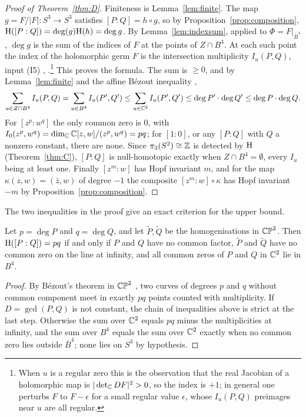 \begin{proof}[Proof of Theorem~\ref{thm:D}]
Finiteness is Lemma~\ref{lem:finite}. The map $g=F/|F|\colon S^3\to S^3$ satisfies $[P:Q]=h\circ g$, so by Proposition~\ref{prop:composition}, $\mathrm{H}([P:Q])=\deg(g)\mathrm{H}(h)=\deg g$. By Lemma~\ref{lem:indexsum}, applied to $\Phi=F|_{\bar B^4}$, $\deg g$ is the sum of the indices of $F$ at the points of $Z\cap B^4$. At each such point the index of the holomorphic germ $F$ is the intersection multiplicity $I_u(P,Q)$, input (I5) \cite[Chapter~5]{GH78}, \cite[Chapter~5]{AGV85}.\footnote{When $u$ is a regular zero this is the observation that the real Jacobian of a holomorphic map is $|\det_{\mathbb{C}} DF|^2>0$, so the index is $+1$; in general one perturbs $F$ to $F-\epsilon$ for a small regular value $\epsilon$, whose $I_u(P,Q)$ preimages near $u$ are all regular.} This proves the formula. The sum is $\ge0$, and by Lemma~\ref{lem:finite} and the affine B\'ezout inequality \cite[Section~5.3]{Ful69},
\[
\sum_{u\in Z\cap B^4}I_u(P,Q)=\sum_{u\in B^4}I_u(P',Q')\le\sum_{u\in\mathbb{C}^2}I_u(P',Q')\le\deg P'\cdot\deg Q'\le\deg P\cdot\deg Q .
\]
For $[z^p:w^q]$ the only common zero is $0$, with $I_0(z^p,w^q)=\dim_{\mathbb{C}}\mathbb{C}[z,w]/(z^p,w^q)=pq$; for $[1:0]$, or any $[P:Q]$ with $Q$ a nonzero constant, there are none. Since $\pi_3(S^2)\cong\mathbb{Z}$ is detected by $\mathrm{H}$ (Theorem~\ref{thm:C}), $[P:Q]$ is null-homotopic exactly when $Z\cap B^4=\emptyset$, every $I_u$ being at least one. Finally $[z^m:w]$ has Hopf invariant $m$, and for the map $\kappa(z,w)=(\bar z,w)$ of degree $-1$ the composite $[z^m:w]\circ\kappa$ has Hopf invariant $-m$ by Proposition~\ref{prop:composition}.
\end{proof}

The two inequalities in the proof give an exact criterion for the upper bound.

\begin{proposition}[Equality]\label{prop:equality}
Let $p=\deg P$ and $q=\deg Q$, and let $\tilde P,\tilde Q$ be the homogenisations in $\mathbb{CP}^2$. Then $\mathrm{H}([P:Q])=pq$ if and only if $P$ and $Q$ have no common factor, $\tilde P$ and $\tilde Q$ have no common zero on the line at infinity, and all common zeros of $P$ and $Q$ in $\mathbb{C}^2$ lie in $B^4$.
\end{proposition}

\begin{proof}
By B\'ezout's theorem in $\mathbb{CP}^2$ \cite[Section~5.3]{Ful69}, two curves of degrees $p$ and $q$ without common component meet in exactly $pq$ points counted with multiplicity. If $D=\gcd(P,Q)$ is not constant, the chain of inequalities above is strict at the last step. Otherwise the sum over $\mathbb{C}^2$ equals $pq$ minus the multiplicities at infinity, and the sum over $B^4$ equals the sum over $\mathbb{C}^2$ exactly when no common zero lies outside $\bar B^4$; none lies on $S^3$ by hypothesis.
\end{proof}

